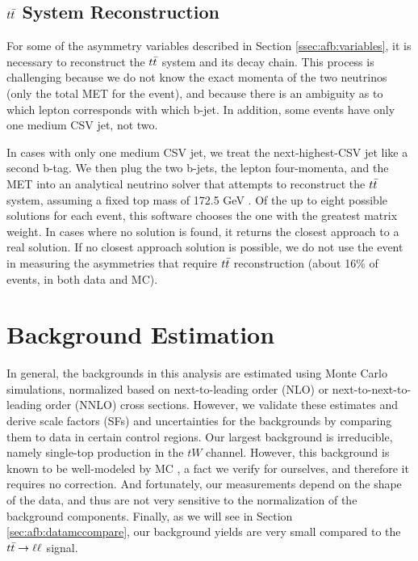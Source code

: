 \subsection{\texorpdfstring{$t\bar{t}$}{ttbar} System Reconstruction}
\label{ssec:afb:ttbarreconstruction}

For some of the asymmetry variables described in Section
\ref{ssec:afb:variables}, it is necessary to reconstruct the $t\bar{t}$
system and its decay chain. This process is challenging because we do not
know the exact momenta of the two neutrinos (only the total MET for
the event), and because there is an ambiguity as to which lepton
corresponds with which b-jet. In addition, some events have only one
medium CSV jet, not two.

In cases with only one medium CSV jet, we treat the next-highest-CSV
jet like a second b-tag. We then plug the two b-jets, the lepton
four-momenta, and the MET into an analytical neutrino solver that
attempts to reconstruct the $t\bar{t}$ system, assuming a fixed top mass
of 172.5 GeV \cite{nusolver}. Of the up to eight possible solutions
for each event, this software chooses the one with the greatest matrix
weight. In cases where no solution is found, it returns the closest
approach to a real solution. If no closest approach solution is
possible, we do not use the event in measuring the asymmetries that
require $t\bar{t}$ reconstruction (about 16\% of events, in both data
and MC).


\section{Background Estimation}
\label{sec:afb:background}

In general, the backgrounds in this analysis are estimated using Monte
Carlo simulations, normalized based on next-to-leading order (NLO) or
next-to-next-to-leading order (NNLO) cross sections. However, we
validate these estimates and
derive scale factors (SFs) and uncertainties for the backgrounds by
comparing them to data in certain control regions. Our largest
background is irreducible, namely single-top production
in the $tW$ channel. However, this background is known to be
well-modeled by MC \cite{twxsec}, a fact we verify for ourselves, and
therefore it requires no correction.
And fortunately, our measurements depend on the shape of the data, and
thus are not very sensitive to the normalization of the background
components. Finally, as we will see in Section
\ref{sec:afb:datamccompare}, our background yields are very small
compared to the $t\bar{t} \rightarrow \ell\ell$ signal.

